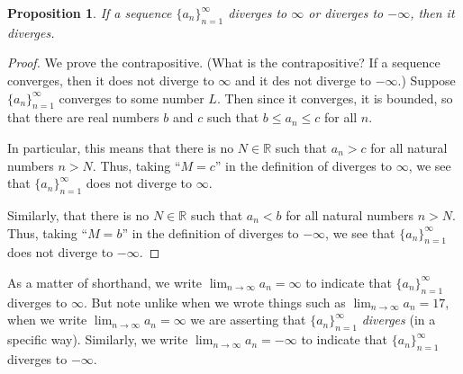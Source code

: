 \documentclass[12pt]{amsart}
\newcommand{\R}{{\mathbb{R}}}
\numberwithin{equation}{section}
\theoremstyle{plain} %
\newtheorem{prop}[equation]{Proposition}
\theoremstyle{definition}
\theoremstyle{remark}
\begin{document}
\begin{prop} If a sequence $\{a_n\}_{n=1}^\infty$ diverges to $\infty$ or diverges to $-\infty$, then it diverges.
\end{prop}
\begin{proof}
We prove the contrapositive. (What is the contrapositive? If a sequence converges, then it does not diverge to $\infty$ and it des not diverge to $-\infty$.) Suppose 
$\{a_n\}_{n=1}^\infty$ converges to some number $L$. Then since it converges,  it is  bounded, so that there are real numbers $b$ and $c$ such that $b \leq a_n \leq c$ for all $n$.

In particular, this means that there is no $N\in \R$ such that $a_n > c$ for all natural numbers $n>N$. Thus, taking ``$M=c$'' in the definition of diverges to $\infty$, we see that $\{a_n\}_{n=1}^\infty$ does not diverge to $\infty$.

Similarly, that there is no $N\in \R$ such that $a_n <b$ for all natural numbers $n>N$. Thus, taking ``$M=b$'' in the definition of diverges to $-\infty$, we see that $\{a_n\}_{n=1}^\infty$ does not diverge to $-\infty$.
\end{proof}

As a matter of shorthand, we write  $\lim_{n \to \infty} a_n = \infty$ to indicate that $\{a_n\}_{n=1}^\infty$ diverges to $\infty$.
But note unlike when we wrote things such as $\lim_{n \to \infty} a_n = 17$, when we write
$\lim_{n \to \infty} a_n = \infty$ we are asserting that $\{a_n\}_{n=1}^\infty$ {\em diverges} (in a specific way). 
Similarly, we write $\lim_{n \to \infty} a_n = -\infty$ to indicate that $\{a_n\}_{n=1}^\infty$ diverges to $-\infty$.
\end{document}
